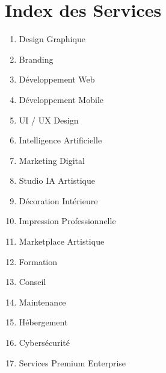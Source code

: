 \documentclass[12pt,a4paper,oneside]{book}
\begin{document}
\appendix

\chapter{Index des Services}
\begin{enumerate}
\item Design Graphique
\item Branding
\item Développement Web
\item Développement Mobile
\item UI / UX Design
\item Intelligence Artificielle
\item Marketing Digital
\item Studio IA Artistique
\item Décoration Intérieure
\item Impression Professionnelle
\item Marketplace Artistique
\item Formation
\item Conseil
\item Maintenance
\item Hébergement
\item Cybersécurité
\item Services Premium Enterprise
\end{enumerate}
\end{document}
